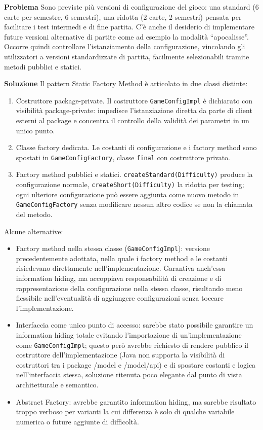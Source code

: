 \documentclass[11pt, a4paper, oneside]{report}
\begin{document}
\noindent\textbf{Problema} Sono previste più versioni di configurazione del gioco: una standard (6 carte per semestre, 6 semestri), una ridotta (2 carte, 2 semestri) pensata per facilitare i test intermedi e di fine partita. C'è anche il desiderio di implementare future versioni alternative di partite come ad esempio la modalità ``apocalisse''.
Occorre quindi controllare l'istanziamento della configurazione, vincolando gli utilizzatori a versioni standardizzate di partita, facilmente selezionabili tramite metodi pubblici e statici.

\noindent\noindent\textbf{Soluzione} Il pattern Static Factory Method è articolato in due classi distinte:

\begin{enumerate}
\item Costruttore package-private. Il costruttore \texttt{GameConfigImpl} è dichiarato con visibilità package-private: impedisce l'istanziazione diretta da parte di client esterni al package e concentra il controllo della validità dei parametri in un unico punto.
\item Classe factory dedicata. Le costanti di configurazione e i factory method sono spostati in \texttt{GameConfigFactory}, classe \texttt{final} con costruttore privato.

\item Factory method pubblici e statici. \texttt{createStandard(Difficulty)} produce la configurazione normale, \texttt{createShort(Difficulty)} la ridotta per testing; ogni ulteriore configurazione può essere aggiunta come nuovo metodo in \texttt{GameConfigFactory} senza modificare nessun altro codice se non la chiamata del metodo.
\end{enumerate}

Alcune alternative:
\begin{itemize}
\item Factory method nella stessa classe (\texttt{GameConfigImpl}): versione precedentemente adottata, nella quale i factory method e le costanti risiedevano direttamente nell'implementazione. Garantiva anch'essa information hiding, ma accoppiava responsabilità di creazione e di rappresentazione della configurazione nella stessa classe, risultando meno flessibile nell'eventualità di aggiungere configurazioni senza toccare l'implementazione.
\item Interfaccia come unico punto di accesso: sarebbe stato possibile garantire un information hiding totale evitando l'importazione di un'implementazione come \texttt{GameConfigImpl}; questo però avrebbe richiesto di rendere pubblico il costruttore dell'implementazione (Java non supporta la visibilità di costruttori tra i package /model e /model/api) e di spostare costanti e logica nell'interfaccia stessa, soluzione ritenuta poco elegante dal punto di vista architetturale e semantico.
\item Abstract Factory: avrebbe garantito information hiding, ma sarebbe risultato troppo verboso per varianti la cui differenza è solo di qualche variabile numerica o future aggiunte di difficoltà.
\end{itemize}
\end{document}
